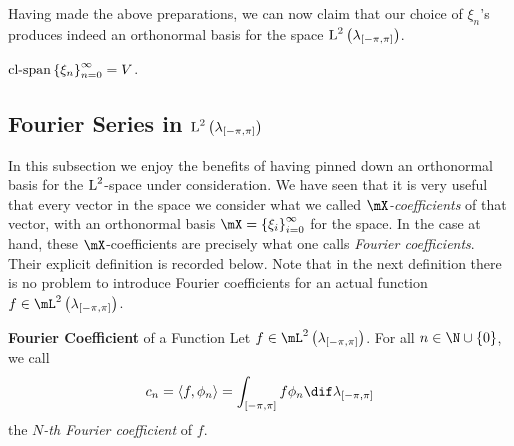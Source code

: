 \documentclass[pmath450]{subfiles}
\begin{document}

    \np Having made the above preparations, we can now claim that our choice of $\xi_n$'s produces indeed an orthonormal basis for the space $\operatorname{L}^{2}\left( \lambda_{\left[ -\pi,\pi \right]} \right)$.

    \begin{prop}{}
        $\operatorname{cl-span}\left\lbrace \xi_n \right\rbrace^{\infty}_{n=0}=V$.
    \end{prop}

    \rruleline

    \subsection{Fourier Series in $\operatorname{L}^{2}\left( \lambda_{\left[ -\pi,\pi \right]} \right)$}

    In this subsection we enjoy the benefits of having pinned down an orthonormal basis for the $\operatorname{L}^{2}$-space under consideration. We have seen that it is very useful that every vector in the space we consider what we called \textit{$\mX$-coefficients} of that vector, with an orthonormal basis $\mX=\left\lbrace \xi_i \right\rbrace^{\infty}_{i=0}$ for the space. In the case at hand, these $\mX$-coefficients are precisely what one calls \textit{Fourier coefficients}. Their explicit definition is recorded below. Note that in the next definition there is no problem to introduce Fourier coefficients for an actual function $f\in\mL^{2}\left( \lambda_{\left[ -\pi,\pi \right]} \right)$.

    \begin{definition}{\textbf{Fourier Coefficient} of a Function}
        Let $f\in\mL^{2}\left( \lambda_{\left[ -\pi,\pi \right]} \right)$. For all $n\in\N\cup\left\lbrace 0 \right\rbrace$, we call
        \begin{equation*}
            c_n = \left\langle f, \phi_n\right\rangle = \int^{}_{\left[ -\pi,\pi \right]}f\phi_n\dif\lambda_{\left[ -\pi,\pi \right]}
        \end{equation*}
        the \emph{$N$-th Fourier coefficient} of $f$.
    \end{definition}
    
\end{document}
